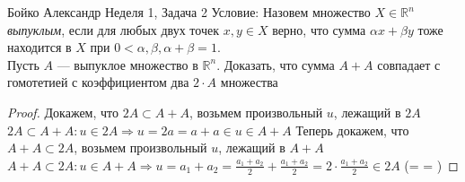 \documentclass[a4paper,12pt]{article}
\numberwithin{equation}{section}
\theoremstyle{plain}
\theoremstyle{definition}
\theoremstyle{remark}
\begin{document}

Бойко Александр
\newline
\newline
Неделя 1, Задача 2 \newline
Условие:
Назовем множество $X \in \mathbb{R}^n$ \textit{выпуклым}, если для любых двух точек $x, y \in X$ верно, что сумма $\alpha x + \beta y$ тоже находится в $X$ при  $0 < \alpha, \beta, \alpha + \beta = 1$.\\
Пусть $A$ --- выпуклое множество в $\mathbb{R}^n$. Доказать, что сумма $A+A$ совпадает с гомотетией с коэффициентом два $2\cdot A$ множества
\begin{proof} \newline
Докажем, что $2A \subset A + A$, возьмем произвольный $u$, лежащий в $2A$ \newline
$2A \subset A + A : u \in 2A \Rightarrow u = 2a = a + a \in u \in A + A$
\newline
\newline
Теперь докажем, что $A + A \subset 2A$, возьмем произвольный $u$, лежащий в $A + A$ \newline
$A + A \subset 2A : u \in A + A \Rightarrow u = a_1 + a_2 = \frac{a_1 + a_2}{2} + \frac{a_1 + a_2}{2} = 2 \cdot \frac{a_1 + a_2}{2} \in 2A$ \newline
\Rightarrow (\alpha = \beta = )


\end{proof}
\end{document}
